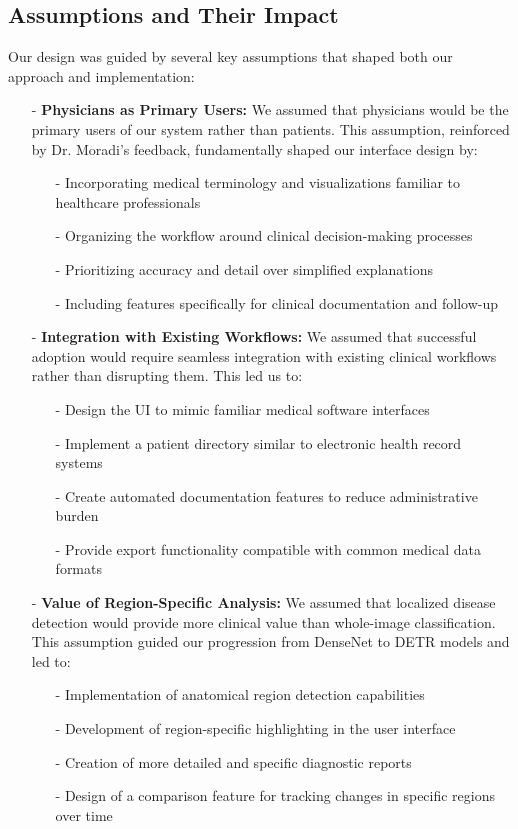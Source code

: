 \documentclass{article}
\begin{document}
\subsection{Assumptions and Their Impact}

Our design was guided by several key assumptions that shaped both our approach and implementation:

\begin{itemize}
    \item[-] \textbf{Physicians as Primary Users:} We assumed that physicians would be the primary users of our system rather than patients. This assumption, reinforced by Dr. Moradi's feedback, fundamentally shaped our interface design by:
    \begin{itemize}
        \item[-] Incorporating medical terminology and visualizations familiar to healthcare professionals
        \item[-] Organizing the workflow around clinical decision-making processes
        \item[-] Prioritizing accuracy and detail over simplified explanations
        \item[-] Including features specifically for clinical documentation and follow-up
    \end{itemize}
    
    \item[-] \textbf{Integration with Existing Workflows:} We assumed that successful adoption would require seamless integration with existing clinical workflows rather than disrupting them. This led us to:
    \begin{itemize}
        \item[-] Design the UI to mimic familiar medical software interfaces
        \item[-] Implement a patient directory similar to electronic health record systems
        \item[-] Create automated documentation features to reduce administrative burden
        \item[-] Provide export functionality compatible with common medical data formats
    \end{itemize}
    
    \item[-] \textbf{Value of Region-Specific Analysis:} We assumed that localized disease detection would provide more clinical value than whole-image classification. This assumption guided our progression from DenseNet to DETR models and led to:
    \begin{itemize}
        \item[-] Implementation of anatomical region detection capabilities
        \item[-] Development of region-specific highlighting in the user interface
        \item[-] Creation of more detailed and specific diagnostic reports
        \item[-] Design of a comparison feature for tracking changes in specific regions over time
    \end{itemize}
\end{itemize}
\end{document}
